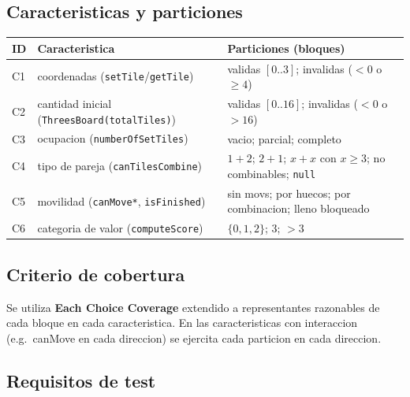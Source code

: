 \documentclass[12pt,a4paper]{article}
\begin{document}
\subsection{Caracteristicas y particiones}

\begin{center}
\begin{tabular}{lll}
\toprule
ID & Caracteristica & Particiones (bloques) \\
\midrule
C1 & coordenadas (\texttt{setTile}/\texttt{getTile}) & validas $[0..3]$; invalidas ($< 0$ o $\ge 4$) \\
C2 & cantidad inicial (\texttt{ThreesBoard(totalTiles)}) & validas $[0..16]$; invalidas ($< 0$ o $> 16$) \\
C3 & ocupacion (\texttt{numberOfSetTiles}) & vacio; parcial; completo \\
C4 & tipo de pareja (\texttt{canTilesCombine}) & $1+2$; $2+1$; $x+x$ con $x \ge 3$; no combinables; \texttt{null} \\
C5 & movilidad (\texttt{canMove*}, \texttt{isFinished}) & sin movs; por huecos; por combinacion; lleno bloqueado \\
C6 & categoria de valor (\texttt{computeScore}) & $\{0,1,2\}$; $3$; $> 3$ \\
\bottomrule
\end{tabular}
\end{center}

\subsection{Criterio de cobertura}

Se utiliza \textbf{Each Choice Coverage} extendido a representantes razonables de cada bloque
en cada caracteristica. En las caracteristicas con interaccion (e.g.\ canMove en cada
direccion) se ejercita cada particion en cada direccion.

\subsection{Requisitos de test}
\end{document}
